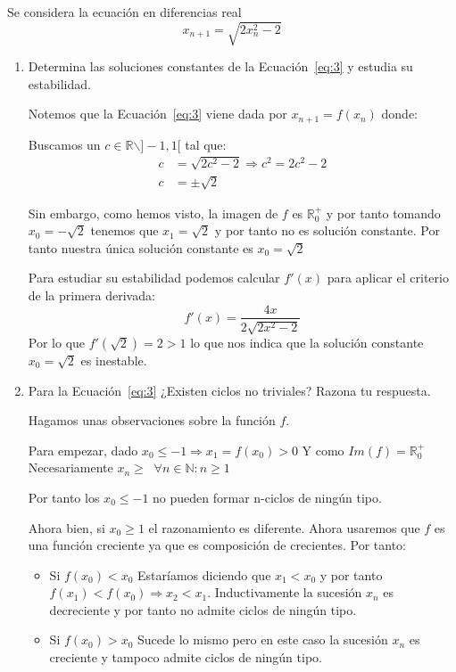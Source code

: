 \documentclass[12pt]{article}
\begin{document}
    \begin{ejercicio}[4 puntos] Se considera la ecuación en diferencias real
    \begin{equation}\label{eq:3}
    x_{n+1}=\sqrt{2x_n^2-2}
    \end{equation}
    \begin{enumerate}
    \item Determina las soluciones constantes de la Ecuación~\ref{eq:3} y estudia su estabilidad.
    
    Notemos que la Ecuación~\ref{eq:3} viene dada por $x_{n+1}=f(x_n)$ donde:
    \Func{f}{\mathbb{R}\backslash\left]-1,1\right[}{\mathbb{R}^+_0}{x}{\sqrt{2x^2-2}}
    
    Buscamos un $c\in\mathbb{R}\backslash]-1,1[$ tal que:
    \begin{align*}
    c &= \sqrt{2c^2-2} \Rightarrow c^2 = 2c^2-2\\
    c &= \pm\sqrt{2}
    \end{align*}
    
    Sin embargo, como hemos visto, la imagen de $f$ es $\mathbb{R}^+_0$ y por tanto tomando $x_0=-\sqrt{2}$ tenemos que $x_1 = \sqrt{2}$ y por tanto no es solución constante.
    Por tanto nuestra única solución constante es $x_0=\sqrt{2}$
    
    Para estudiar su estabilidad podemos calcular $f'(x)$ para aplicar el criterio de la primera derivada:
	\[f'(x)=\frac{4x}{2\sqrt{2x^2-2}}\]
	Por lo que $f'(\sqrt{2})=2 > 1$ lo que nos indica que la solución constante $x_0=\sqrt{2}$ es inestable.
	\item Para la Ecuación~\ref{eq:3} ¿Existen ciclos no triviales? Razona tu respuesta.
	
	Hagamos unas observaciones sobre la función $f$.
	
	Para empezar, dado $x_0\leqslant-1 \Rightarrow x_1=f(x_0)>0$ Y como $Im(f)=\mathbb{R}^+_0$ Necesariamente $x_n\geq\;\;\forall n\in\mathbb{N}: n\geq 1$ 
	
	Por tanto los $x_0\leqslant-1$ no pueden formar n-ciclos de ningún tipo.
	
	Ahora bien, si $x_0 \geq 1$ el razonamiento es diferente. Ahora usaremos que $f$ es una función creciente ya que es composición de crecientes. Por tanto:
	\begin{itemize}
	\item Si $f(x_0) < x_0$
	Estaríamos diciendo que $x_1 < x_0$ y por tanto $f(x_1) < f(x_0) \Rightarrow x_2 < x_1$. Inductivamente la sucesión $x_n$ es decreciente y por tanto no admite ciclos de ningún tipo.
	\item Si $f(x_0) > x_0$
	Sucede lo mismo pero en este caso la sucesión $x_n$ es creciente y tampoco admite ciclos de ningún tipo.
	\end{itemize}
	

\end{enumerate}
\end{ejercicio}
\end{document}
